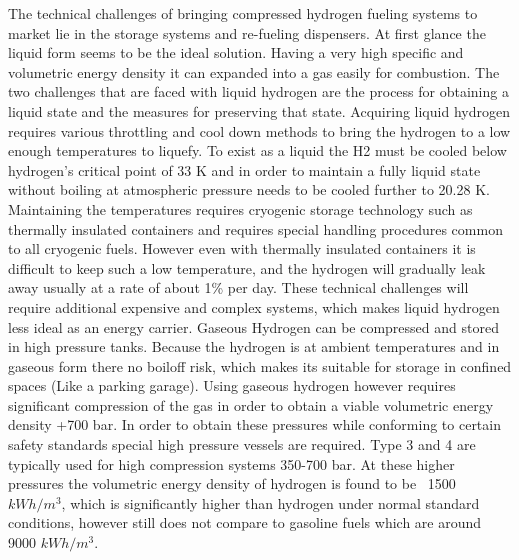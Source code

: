 \documentclass[paper=a4, fontsize=11pt, abstract=on]{scrartcl}
\numberwithin{equation}{section}		%
\numberwithin{figure}{section}			%
\numberwithin{table}{section}				%
\begin{document}
The technical challenges of bringing compressed hydrogen fueling systems to market lie in the storage systems and re-fueling dispensers. At first glance the liquid form seems to be the ideal solution. Having a very high specific and volumetric energy density it can expanded into a gas easily for combustion. The two challenges that are faced with liquid hydrogen are the process for obtaining a liquid state and the measures for preserving that state. Acquiring liquid hydrogen requires various throttling and cool down methods to bring the hydrogen to a low enough temperatures to liquefy. To exist as a liquid the H2 must be cooled below hydrogen's critical point of 33 K and in order to maintain a fully liquid state without boiling at atmospheric pressure needs to be cooled further to 20.28 K. Maintaining the temperatures requires cryogenic storage technology such as thermally insulated containers and requires special handling procedures common to all cryogenic fuels. However even with thermally insulated containers it is difficult to keep such a low temperature, and the hydrogen will gradually leak away usually at a rate of about 1\% per day. These technical challenges will require additional expensive and complex systems, which makes liquid hydrogen less ideal as an energy carrier. 
 Gaseous Hydrogen can be compressed and stored in high pressure tanks. Because the hydrogen is at ambient temperatures and in gaseous form there no boiloff risk, which makes its suitable for storage in confined spaces (Like a parking garage). Using gaseous hydrogen however requires significant compression of the gas in order to obtain a viable volumetric energy density +700 bar. In order to obtain these pressures while conforming to certain safety standards special high pressure vessels are required.  Type 3 and 4 are typically used for high compression systems 350-700 bar. At these higher pressures the volumetric energy density of hydrogen is found to be ~1500 $kWh/m^3$, which is significantly higher than hydrogen under normal standard conditions, however still does not compare to gasoline fuels which are around 9000 $kWh/m^3$.
\end{document}
